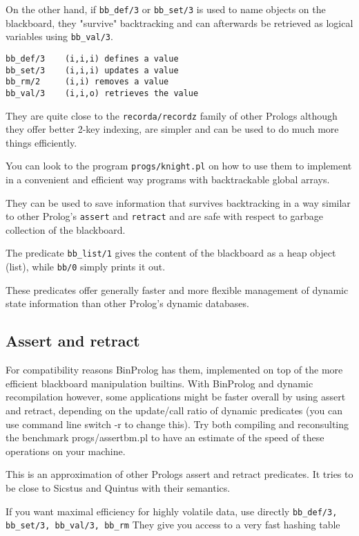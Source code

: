 \documentclass{article}
\begin{document}
On the other hand, if {\tt bb\_def/3} or {\tt bb\_set/3} is used to name objects on the
blackboard, they "survive" backtracking and can afterwards be retrieved as
logical variables using {\tt bb\_val/3}.

\begin{verbatim}
bb_def/3    (i,i,i) defines a value
bb_set/3    (i,i,i) updates a value
bb_rm/2     (i,i) removes a value
bb_val/3    (i,i,o) retrieves the value
\end{verbatim}

They are quite close to the {\tt recorda/recordz} family of other
Prologs although they offer better 2-key indexing, are simpler and can
be used to do much more things efficiently.

You can look to the program {\tt progs/knight.pl} on how to use them to
implement in a convenient and efficient way programs with backtrackable
global arrays.

They can be used to save information that survives backtracking in a
way similar to other Prolog's {\tt assert} and {\tt retract} and are safe
with respect to garbage collection of the blackboard.

The predicate {\tt bb\_list/1} gives the content of the blackboard as a heap object (list), while {\tt bb/0} simply prints it out.

These predicates offer generally faster and more flexible management of
dynamic state information than other Prolog's dynamic databases.


\subsection{Assert and retract}

For compatibility reasons
BinProlog has them, implemented on top of the more efficient
blackboard manipulation builtins.
With BinProlog  and dynamic recompilation however,
some applications might be faster overall by using
assert and retract, depending on the update/call ratio of
dynamic predicates (you can use command line switch -r to
change this). Try both compiling and reconsulting 
the benchmark progs/assertbm.pl
to have an estimate of the speed of these operations on your
machine.

This is an approximation of other Prologs assert and retract predicates.
It tries to be close to Sicstus and Quintus with their semantics.

If you want maximal efficiency for highly volatile data, use directly 
{\tt bb\_def/3, bb\_set/3, bb\_val/3, bb\_rm}
They give you access to a very fast hashing table 
\end{document}
